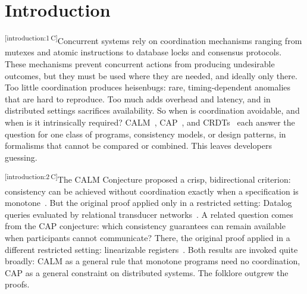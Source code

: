 \documentclass[sigconf]{cidr-2027}
\theoremstyle{remark}
\newcommand{\cxtag}[2]{\textsuperscript{\textsf{\tiny[#1\,#2]}}}
\begin{document}

\maketitle
{}\par

\section{Introduction}
\label{sec:intro}

\color{black!45}\cxtag{introduction:1}{C}Concurrent systems rely on coordination mechanisms ranging from mutexes and
atomic instructions to database locks and consensus protocols.  These mechanisms
prevent concurrent actions from producing undesirable outcomes, but they must be
used where they are needed, and ideally only there.  Too little coordination
produces heisenbugs: rare, timing-dependent anomalies that are hard to
reproduce.  Too much adds overhead and latency, and in distributed settings
sacrifices availability.  So when is coordination avoidable, and when is it
intrinsically required?  CALM~\cite{ameloot2013relational},
CAP~\cite{gilbert2002cap}, and CRDTs~\cite{shapiro2011crdt} each answer the
question for one class of programs, consistency models, or design patterns, in
formalisms that cannot be compared or combined.  This leaves developers
guessing.\color{black}

\color{black!45}\cxtag{introduction:2}{C}The CALM Conjecture proposed a crisp, bidirectional criterion:
consistency can be achieved without coordination exactly when a specification
is monotone~\cite{hellerstein2010declarative}.  But the original proof applied
only in a restricted setting: Datalog queries evaluated by relational transducer
networks~\cite{ameloot2013relational,hellerstein2020keeping}. A related
question comes from the CAP conjecture: which consistency guarantees can remain
available when participants cannot communicate? There, the original proof
applied in a different restricted setting: linearizable
registers~\cite{brewer2000towards,gilbert2002cap}.  Both results are invoked
quite broadly: CALM as a general rule that monotone programs need no
coordination, CAP as a general constraint on distributed systems. The folklore
outgrew the proofs.\color{black}
\end{document}
